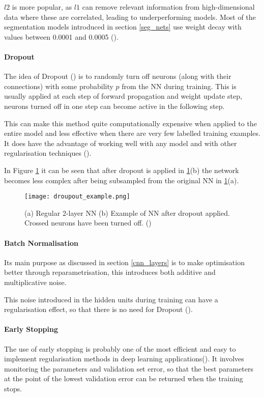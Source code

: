$l2$ is more popular, as $l1$ can remove relevant information from high-dimensional data where these are correlated, leading to underperforming models. Most of the segmentation models introduced in section \ref{seg_nets} use weight decay with values between 0.0001 and 0.0005 (\cite{sultana2020106062}).
\paragraph{Dropout} 
The idea of Dropout (\cite{JMLR:v15:srivastava14a}) is to randomly turn off neurons (along with their connections) with some probability $p$ from the \gls{NN} during training. This is usually applied at each step of forward propagation and weight update step, neurons turned off in one step can become active in the following step.

This can make this method quite computationally expensive when applied to the entire model and less effective when there are very few labelled training examples. It does have the advantage of working well with any model and with other regularisation techniques (\cite{GoodBengCour16}).

In Figure \ref{fig_dropout} it can be seen that after dropout is applied in \ref{fig_dropout}(b) the network becomes less complex after being subsampled from the original \gls{NN} in \ref{fig_dropout}(a).

    \begin{figure}[hbt!]
        \centering
        \texttt{[image: droupout\_example.png]}
        \caption{(a) Regular 2-layer \gls{NN} (b) Example of \gls{NN} after dropout applied. Crossed neurons have been turned off. (\cite{shanmugamani2018deep})}
        \label{fig_dropout}
    \end{figure}

\paragraph{Batch Normalisation}
Its main purpose as discussed in section \ref{cnn_layers} is to make optimisation better through reparametrisation, this introduces both additive and multiplicative noise.

This noise introduced in the hidden units during training can have a regularisation effect, so that there is no need for Dropout (\cite{GoodBengCour16}).
\paragraph{Early Stopping} 
The use of early stopping is probably one of the most efficient and easy to implement regularisation methods in deep learning applications(\cite{GoodBengCour16}). It involves monitoring the parameters and validation set error, so that the best parameters at the point of the lowest validation error can be returned when the training stops. 

